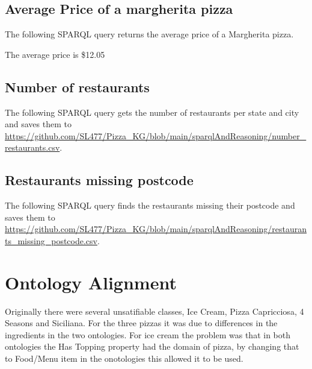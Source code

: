 \documentclass[11pt]{report} %
\begin{document}



\section{Average Price of a margherita pizza}

The following SPARQL query returns the average price of a Margherita pizza.



The average price is \$12.05

\section{Number of restaurants}

The following SPARQL query gets the number of restaurants per state and city and saves them to \url{https://github.com/SL477/Pizza_KG/blob/main/sparqlAndReasoning/number_restaurants.csv}.



\section{Restaurants missing postcode}

The following SPARQL query finds the restaurants missing their postcode and saves them to \url{https://github.com/SL477/Pizza_KG/blob/main/sparqlAndReasoning/restaurants_missing_postcode.csv}.



\chapter{Ontology Alignment}
Originally there were several unsatifiable classes, Ice Cream, Pizza Capricciosa, 4 Seasons and Siciliana.
For the three pizzas it was due to differences in the ingredients in the two ontologies.
For ice cream the problem was that in both ontologies the Has Topping property had the domain of pizza, by changing that to Food/Menu item in the onotologies this allowed it to be used.
\end{document}
